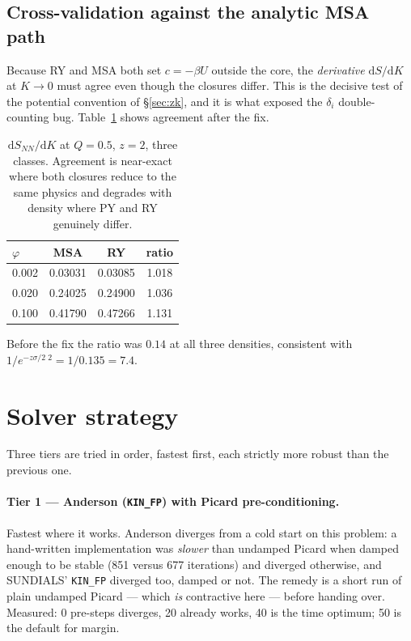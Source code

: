 \documentclass[11pt,a4paper]{article}
\newcommand{\code}[1]{\texttt{#1}}
\begin{document}
\subsection{Cross-validation against the analytic MSA path}

Because RY and MSA both set $c=-\beta U$ outside the core, the
\emph{derivative} $\mathrm{d}S/\mathrm{d}K$ at $K\to0$ must agree even though
the closures differ. This is the decisive test of the potential convention of
\S\ref{sec:zk}, and it is what exposed the $\delta_i$ double-counting bug.
Table~\ref{tab:msary} shows agreement after the fix.

\begin{table}[htbp]
\centering
\caption{$\mathrm{d}S_{NN}/\mathrm{d}K$ at $Q=0.5$, $z=2$, three classes.
Agreement is near-exact where both closures reduce to the same physics and
degrades with density where PY and RY genuinely differ.}
\label{tab:msary}
\begin{tabular}{lccc}
\toprule
$\varphi$ & MSA & RY & ratio\\
\midrule
0.002 & 0.03031 & 0.03085 & 1.018\\
0.020 & 0.24025 & 0.24900 & 1.036\\
0.100 & 0.41790 & 0.47266 & 1.131\\
\bottomrule
\end{tabular}
\end{table}

Before the fix the ratio was $0.14$ at all three densities, consistent with
$1/e^{-z\sigma/2}\,^2=1/0.135=7.4$.

\section{Solver strategy}
\label{mc:sec:solvers}

Three tiers are tried in order, fastest first, each strictly more robust than
the previous one.

\paragraph{Tier 1 --- Anderson (\code{KIN\_FP}) with Picard
pre-conditioning.} Fastest where it works. Anderson diverges from a cold
start on this problem: a hand-written implementation was \emph{slower} than
undamped Picard when damped enough to be stable (851 versus 677 iterations)
and diverged otherwise, and SUNDIALS' \code{KIN\_FP} diverged too, damped or
not. The remedy is a short run of plain undamped Picard --- which \emph{is}
contractive here --- before handing over. Measured: 0 pre-steps diverges, 20
already works, 40 is the time optimum; 50 is the default for margin.
\end{document}
